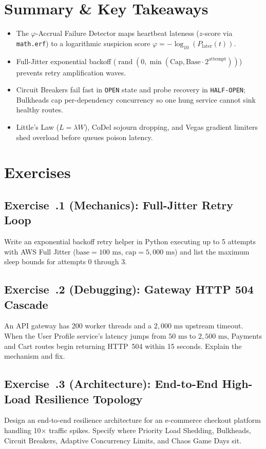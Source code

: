\section{Summary \protect\& Key Takeaways}
\begin{itemize}[leftmargin=18pt]
  \item The $\varphi$-Accrual Failure Detector maps heartbeat lateness ($z$-score via \texttt{math.erf}) to a logarithmic suspicion score $\varphi = -\log_{10}(P_{\text{later}}(t))$.
  \item Full-Jitter exponential backoff ($\operatorname{rand}(0, \min(\text{Cap}, \text{Base} \cdot 2^{\text{attempt}}))$) prevents retry amplification waves.
  \item Circuit Breakers fail fast in \texttt{OPEN} state and probe recovery in \texttt{HALF-OPEN}; Bulkheads cap per-dependency concurrency so one hung service cannot sink healthy routes.
  \item Little's Law ($L = \lambda W$), CoDel sojourn dropping, and Vegas gradient limiters shed overload before queues poison latency.
\end{itemize}

\section{Exercises}

\subsection*{Exercise~\thechapter.1 (Mechanics): Full-Jitter Retry Loop}
Write an exponential backoff retry helper in Python executing up to 5 attempts with AWS Full Jitter ($\text{base}=100\text{ ms}$, $\text{cap}=5{,}000\text{ ms}$) and list the maximum sleep bounds for attempts 0 through 3.

\subsection*{Exercise~\thechapter.2 (Debugging): Gateway HTTP 504 Cascade}
An API gateway has 200 worker threads and a $2{,}000\text{ ms}$ upstream timeout. When the User Profile service's latency jumps from $50\text{ ms}$ to $2{,}500\text{ ms}$, Payments and Cart routes begin returning HTTP~504 within 15 seconds. Explain the mechanism and fix.

\subsection*{Exercise~\thechapter.3 (Architecture): End-to-End High-Load Resilience Topology}
Design an end-to-end resilience architecture for an e-commerce checkout platform handling 10$\times$ traffic spikes. Specify where Priority Load Shedding, Bulkheads, Circuit Breakers, Adaptive Concurrency Limits, and Chaos Game Days sit.

